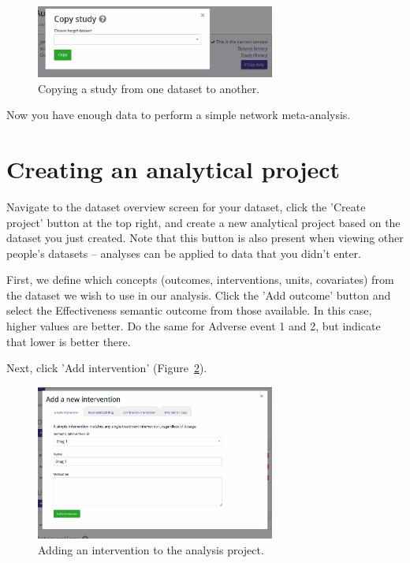 \documentclass[12pt]{article}
\begin{document}
\begin{figure}[!ht]
  \centering
  \includegraphics[width=0.7\textwidth]{img/copyStudy.png}
  \caption{Copying a study from one dataset to another.}
\label{fig:copyStudy}
\end{figure}

Now you have enough data to perform a simple network meta-analysis.

\section{Creating an analytical project}

Navigate to the dataset overview screen for your dataset, click the 'Create project' button at the top right, and create a new analytical project based on the dataset you just created.
Note that this button is also present when viewing other people's datasets -- analyses can be applied to data that you didn't enter.

First, we define which concepts (outcomes, interventions, units, covariates) from the dataset we wish to use in our analysis.
Click the 'Add outcome' button and select the Effectiveness semantic outcome from those available.
In this case, higher values are better.
Do the same for Adverse event 1 and 2, but indicate that lower is better there.

Next, click 'Add intervention' (Figure~\ref{fig:addIntervention}).

\begin{figure}[!ht]
  \centering
  \includegraphics[width=0.7\textwidth]{img/addIntervention.png}
  \caption{Adding an intervention to the analysis project.}
\label{fig:addIntervention}
\end{figure}
\end{document}
